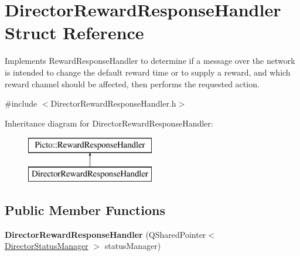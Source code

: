 \hypertarget{struct_director_reward_response_handler}{\section{Director\-Reward\-Response\-Handler Struct Reference}
\label{struct_director_reward_response_handler}
}


Implements Reward\-Response\-Handler to determine if a message over the network is intended to change the default reward time or to supply a reward, and which reward channel should be affected, then performs the requested action.  




{\ttfamily \#include $<$Director\-Reward\-Response\-Handler.\-h$>$}

Inheritance diagram for Director\-Reward\-Response\-Handler\-:\begin{figure}[H]
\begin{center}
\leavevmode
\includegraphics[height=2.000000cm]{struct_director_reward_response_handler}
\end{center}
\end{figure}
\subsection*{Public Member Functions}
\begin{DoxyCompactItemize}
\item 
\hypertarget{struct_director_reward_response_handler_a6a7a49370dd01cdfbe37de460e76551d}{{\bfseries Director\-Reward\-Response\-Handler} (Q\-Shared\-Pointer$<$ \hyperlink{class_director_status_manager}{Director\-Status\-Manager} $>$ status\-Manager)}\label{struct_director_reward_response_handler_a6a7a49370dd01cdfbe37de460e76551d}

\end{DoxyCompactItemize}
